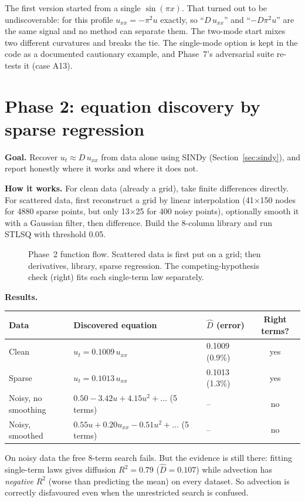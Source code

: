\begin{lesson}
The first version started from a single $\sin(\pi x)$. That turned out to be undiscoverable: for this profile
$u_{xx}=-\pi^2u$ exactly, so ``$D\,u_{xx}$'' and ``$-D\pi^2u$'' are the same signal and no method can separate
them. The two-mode start mixes two different curvatures and breaks the tie. The single-mode option is kept in
the code as a documented cautionary example, and Phase~7's adversarial suite re-tests it (case A13).
\end{lesson}

\section{Phase 2: equation discovery by sparse regression}\label{sec:p2}

\textbf{Goal.} Recover $u_t \approx D\,u_{xx}$ from data alone using SINDy (Section~\ref{sec:sindy}), and
report honestly where it works and where it does not.

\textbf{How it works.} For clean data (already a grid), take finite differences directly. For scattered data,
first reconstruct a grid by linear interpolation (41$\times$150 nodes for 4880 sparse points, but only
13$\times$25 for 400 noisy points), optionally smooth it with a Gaussian filter, then difference. Build the
8-column library and run STLSQ with threshold 0.05.

\begin{figure}[!htb]
\centering

\pkglegend
\caption{Phase~2 function flow. Scattered data is first put on a grid; then derivatives, library, sparse
regression. The competing-hypothesis check (right) fits each single-term law separately.}
\label{fig:p2}
\end{figure}

\textbf{Results.}
\begin{center}
\small
\begin{tabular}{@{}lllc@{}}
\toprule
\textbf{Data} & \textbf{Discovered equation} & $\hat D$ (error) & \textbf{Right terms?} \\ \midrule
Clean  & $u_t = 0.1009\,u_{xx}$ & 0.1009 (0.9\%) & yes \\
Sparse & $u_t = 0.1013\,u_{xx}$ & 0.1013 (1.3\%) & yes \\
Noisy, no smoothing & $0.50 - 3.42u + 4.15u^2 + \ldots$ (5 terms) & -- & no \\
Noisy, smoothed & $0.55u + 0.20u_{xx} - 0.51u^2 + \ldots$ (5 terms) & -- & no \\
\bottomrule
\end{tabular}
\end{center}
On noisy data the free 8-term search fails. But the evidence is still there: fitting single-term laws gives
diffusion $R^2 = 0.79$ ($\hat D = 0.107$) while advection has \emph{negative} $R^2$ (worse than predicting the
mean) on every dataset. So advection is correctly disfavoured even when the unrestricted search is confused.

